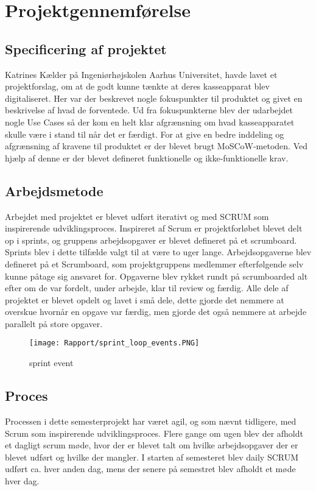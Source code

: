 \section{Projektgennemførelse}
\subsection{Specificering af projektet}
Katrines Kælder på Ingeniørhøjskolen Aarhus Universitet, havde lavet et projektforslag, om at de godt kunne tænkte at deres kasseapparat blev digitaliseret. Her var der beskrevet nogle fokuspunkter til produktet og givet en beskrivelse af hvad de forventede. Ud fra fokuspunkterne blev der udarbejdet nogle Use Cases så der kom en helt klar afgrænsning om hvad kasseapparatet skulle være i stand til når det er færdigt.
\newline
\newline
For at give en bedre inddeling og afgrænsning af kravene til produktet er der blevet brugt MoSCoW-metoden. Ved hjælp af denne er der blevet defineret funktionelle og ikke-funktionelle krav.  


\subsection{Arbejdsmetode}
Arbejdet med projektet er blevet udført iterativt og med SCRUM som inspirerende udviklingsproces. Inspireret af Scrum er projektforløbet blevet delt op i sprints, og gruppens arbejdsopgaver er blevet defineret på et scrumboard. 
\newline
Sprints blev i dette tilfælde valgt til at være to uger lange. Arbejdsopgaverne blev defineret på et Scrumboard, som projektgruppens medlemmer efterfølgende selv kunne påtage sig ansvaret for. Opgaverne blev rykket rundt på scrumboarded alt efter om de var fordelt, under arbejde, klar til review og færdig. 
\newline
\newline
Alle dele af projektet er blevet opdelt og lavet i små dele, dette gjorde det nemmere at overskue hvornår en opgave var færdig, men gjorde det også nemmere at arbejde parallelt på store opgaver. 

\begin{figure}[H]
	\centering
	\texttt{[image: Rapport/sprint\_loop\_events.PNG]}
	\caption{sprint event}
	\label{fig:sprint}
\end{figure} 

\subsection{Proces}
Processen i dette semesterprojekt har været agil, og som nævnt tidligere, med Scrum som inspirerende udviklingsproces.
\newline
\newline
Flere gange om ugen blev der afholdt et dagligt scrum møde, hvor der er blevet talt om hvilke arbejdsopgaver der er blevet udført og hvilke der mangler. I starten af semesteret blev daily SCRUM udført ca. hver anden dag, mens der senere på semestret blev afholdt et møde hver dag. 


